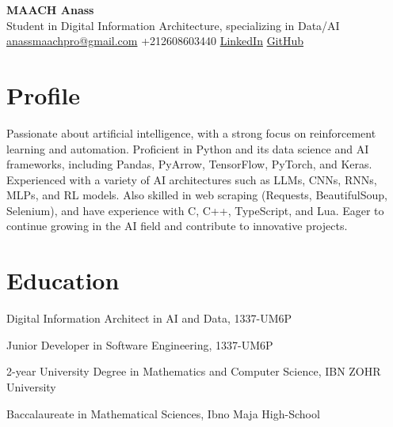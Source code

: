\documentclass[a4paper,11pt]{article}%
\begin{document}
%
\normalsize%
\begin{center}%
{\Huge \textbf{MAACH Anass}}\\[0.3em]%
Student in Digital Information Architecture, specializing in Data/AI\\[0.3em]%
\href{mailto:anassmaachpro@gmail.com}{anassmaachpro@gmail.com}%
 \quad +212608603440 \quad %
\href{https://www.linkedin.com/in/anassmaach}{LinkedIn} \quad %
\href{https://github.com/sboof911}{GitHub}%
\end{center}%
\section*{Profile}%
Passionate about artificial intelligence, with a strong focus on reinforcement learning and automation. Proficient in Python and its data science and AI frameworks, including Pandas, PyArrow, TensorFlow, PyTorch, and Keras.  \newline Experienced with a variety of AI architectures such as LLMs, CNNs, RNNs, MLPs, and RL models.  \newline \newline Also skilled in web scraping (Requests, BeautifulSoup, Selenium), and have experience with C, C++, TypeScript, and Lua.  \newline Eager to continue growing in the AI field and contribute to innovative projects.%
\section*{Education}%
\noindent{}\begin{minipage}[t]{\dimexpr\linewidth-3.5cm\relax}Digital Information Architect in AI and Data, 1337-UM6P\end{minipage}\par%
\noindent{}\begin{minipage}[t]{\dimexpr\linewidth-3.5cm\relax}Junior Developer in Software Engineering, 1337-UM6P\end{minipage}\par%
\noindent{}\begin{minipage}[t]{\dimexpr\linewidth-3.5cm\relax}2-year University Degree in Mathematics and Computer Science, IBN ZOHR University\end{minipage}\par%
\noindent{}\begin{minipage}[t]{\dimexpr\linewidth-3.5cm\relax}Baccalaureate in Mathematical Sciences, Ibno Maja High-School\end{minipage}\par%
\end{document}
